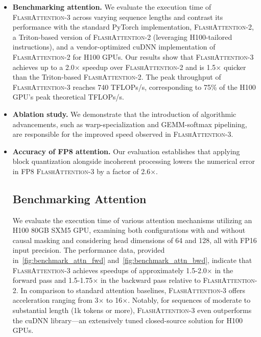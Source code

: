 \begin{itemize}

\item \textbf{Benchmarking attention.} We evaluate the execution time of \textsc{FlashAttention-3} across varying sequence lengths and contrast its performance with the standard PyTorch implementation, \textsc{FlashAttention-2}, a Triton-based version of \textsc{FlashAttention-2} (leveraging H100-tailored instructions), and a vendor-optimized cuDNN implementation of \textsc{FlashAttention-2} for H100 GPUs. Our results show that \textsc{FlashAttention-3} achieves up to a 2.0$\times$ speedup over \textsc{FlashAttention-2} and is 1.5$\times$ quicker than the Triton-based \textsc{FlashAttention-2}. The peak throughput of \textsc{FlashAttention-3} reaches 740 TFLOPs/s, corresponding to 75\% of the H100 GPU's peak theoretical TFLOPs/s.

\item \textbf{Ablation study.} We demonstrate that the introduction of algorithmic advancements, such as warp-specialization and GEMM-softmax pipelining, are responsible for the improved speed observed in \textsc{FlashAttention-3}.

\item \textbf{Accuracy of FP8 attention.} Our evaluation establishes that applying block quantization alongside incoherent processing lowers the numerical error in FP8 \textsc{FlashAttention-3} by a factor of 2.6$\times$.

\subsection{Benchmarking Attention}
\label{subsec:benchmark_attn}

We evaluate the execution time of various attention mechanisms utilizing an H100 80GB SXM5 GPU, examining both configurations with and without causal masking and considering head dimensions of 64 and 128, all with FP16 input precision. The performance data, provided in~\cref{fig:benchmark_attn_fwd} and~\cref{fig:benchmark_attn_bwd}, indicate that \textsc{FlashAttention-3} achieves speedups of approximately 1.5-2.0$\times$ in the forward pass and 1.5-1.75$\times$ in the backward pass relative to \textsc{FlashAttention-2}. In comparison to standard attention baselines, \textsc{FlashAttention-3} offers acceleration ranging from 3$\times$ to 16$\times$. Notably, for sequences of moderate to substantial length (1k tokens or more), \textsc{FlashAttention-3} even outperforms the cuDNN library—an extensively tuned closed-source solution for H100 GPUs.


\end{itemize}
